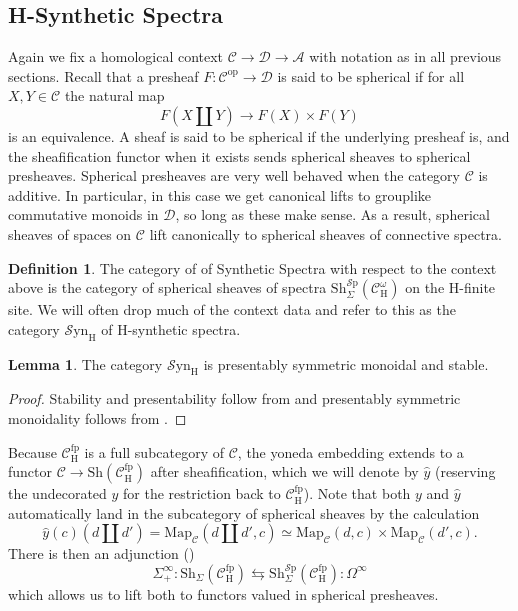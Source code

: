 \documentclass[10pt]{amsart}
\theoremstyle{definition}
\numberwithin{figure}{section}
\numberwithin{equation}{section}
\newtheorem{lemma}[figure]{Lemma}
\newtheorem{definition}[figure]{Definition}
\newcommand{\op}{\mathrm{op}}
\newcommand{\cA}{\mathcal{A}}
\newcommand{\cC}{\mathcal{C}}
\newcommand{\cD}{\mathcal{D}}
\theoremstyle{cited}
\newcommand{\Sp}{{\mathcal{S}\mathrm{p}}}
\newcommand{\Map}{\mathrm{Map}}
\newcommand{\Sh}{\mathrm{Sh}}
\newcommand{\fp}{\mathrm{fp}}
\newcommand{\Syn}{\mathcal{S}\mathrm{yn}}
\renewcommand{\H}{\mathrm{H}}
\begin{document}
\subsection{H-Synthetic Spectra}

Again we fix a homological context $\cC\to \cD\to \cA$ with notation as in all previous sections. Recall that a presheaf $F:\cC^\op\to \cD$ is said to be spherical if for all $X,Y\in \cC$ the natural map
\[
F(X\amalg Y)\to F(X)\times F(Y)
\]
is an equivalence. A sheaf is said to be spherical if the underlying presheaf is, and the sheafification functor when it exists sends spherical sheaves to spherical presheaves. Spherical presheaves are very well behaved when the category $\cC$ is additive. In particular, in this case we get canonical lifts to grouplike commutative monoids in $\cD$, so long as these make sense. As a result, spherical sheaves of spaces on $\cC$ lift canonically to spherical sheaves of connective spectra.

\begin{definition}\label{def:synsp}
  The category of of Synthetic Spectra with respect to the context above is the category of spherical sheaves of spectra $\Sh^\Sp_\Sigma(\cC^\omega_\H)$ on the $\H$-finite site. We will often drop much of the context data and refer to this as the category $\Syn_\H$ of $\H$-synthetic spectra.
\end{definition}

\begin{lemma}\label{lem:synispsms}
  The category $\Syn_\H$ is presentably symmetric monoidal and stable.
\end{lemma}

\begin{proof}
  Stability and presentability follow from \cite[Corollary 2.13]{Pst22} and presentably symmetric monoidality follows from \cite[Proposition 2.30]{Pst22}.
\end{proof}

Because $\cC_\H^\fp$ is a full subcategory of $\cC$, the yoneda embedding extends to a functor $\cC\to \Sh(\cC_\H^\fp)$ after sheafification, which we will denote by $\hat y$ (reserving the undecorated $y$ for the restriction back to $\cC^\fp_\H$). Note that both $y$ and $\hat y$ automatically land in the subcategory of spherical sheaves by the calculation
\[
  \hat y(c)(d\amalg d')=\Map_{\cC}(d\amalg d', c)\simeq \Map_{\cC}(d, c)\times \Map_{\cC}(d', c).
\]
There is then an adjunction (\cite{Pst22})
\[
\Sigma^\infty_+:\Sh_\Sigma(\cC_\H^\fp) \leftrightarrows \Sh_\Sigma^\Sp(\cC_\H^\fp):\Omega^\infty
\]
which allows us to lift both to functors valued in spherical presheaves.
\end{document}
